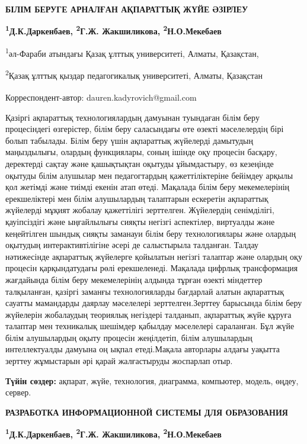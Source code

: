 
{\bfseries БІЛІМ БЕРУГЕ АРНАЛҒАН АҚПАРАТТЫҚ ЖҮЙЕ ӘЗІРЛЕУ}

{\bfseries \textsuperscript{1}Д.К.Даркенбаев\textsuperscript{\envelope },
\textsuperscript{2}Г.Ж. Жакшиликова, \textsuperscript{2}Н.О.Мекебаев}

\textsuperscript{1}әл-Фараби атындағы Қазақ ұлттық университеті, Алматы,
Қазақстан,

\textsuperscript{2}Қазақ ұлттық қыздар педагогикалық университеті,
Алматы, Қазақстан

{\bfseries \textsuperscript{\envelope }}Корреспондент-автор:
dauren.kadyrovich@gmail.com

Қазіргі ақпараттық технологиялардың дамуынан туындаған білім беру
процесіндегі өзгерістер, білім беру саласындағы өте өзекті мәселелердің
бірі болып табылады. Білім беру үшін ақпараттық жүйелерді дамытудың
маңыздылығы, олардың функциялары, соның ішінде оқу процесін басқару,
деректерді сақтау және қашықтықтан оқытуды ұйымдастыру, өз кезеңінде
оқытуды білім алушылар мен педагогтардың қажеттіліктеріне бейімдеу
арқылы қол жетімді және тиімді екенін атап өтеді. Мақалада білім беру
мекемелерінің ерекшеліктері мен білім алушылардың талаптарын ескеретін
ақпараттық жүйелерді мұқият жобалау қажеттілігі зерттелген. Жүйелердің
сенімділігі, қауіпсіздігі және ыңғайлылығы сияқты негізгі аспектілер,
виртуалды және кеңейтілген шындық сияқты заманауи білім беру
технологиялары және олардың оқытудың интерактивтілігіне әсері де
салыстырыла талданған. Талдау нәтижесінде ақпараттық жүйелерге қойылатын
негізгі талаптар және олардың оқу процесін қарқындатудағы рөлі
ерекшеленеді. Мақалада цифрлық трансформация жағдайында білім беру
мекемелерінің алдында тұрған өзекті міндеттер талқыланған, қазіргі
заманғы технологияларды бағдарлай алатын ақпараттық сауатты мамандарды
даярлау мәселелері зерттелген.Зерттеу барысында білім беру жүйелерін
жобалаудың теориялық негіздері талданып, ақпараттық жүйе құруға талаптар
мен техникалық шешімдер қабылдау мәселелері сараланған. Бұл жүйе білім
алушылардың оқыту процесін жеңілдетіп, білім алушылардың интеллектуалды
дамуына оң ықпал етеді.Мақала авторлары алдағы уақытта зерттеу
жұмыстарын әрі қарай жалғастыруды жоспарлап отыр.

{\bfseries Түйін сөздер:} ақпарат, жүйе, технология, диаграмма, компьютер,
модель, өңдеу, сервер.

{\bfseries РАЗРАБОТКА ИНФОРМАЦИОННОЙ СИСТЕМЫ ДЛЯ ОБРАЗОВАНИЯ}

{\bfseries \textsuperscript{1}Д.К.Даркенбаев\textsuperscript{\envelope },
\textsuperscript{2}Г.Ж. Жакшиликова, \textsuperscript{2}Н.О.Мекебаев}

